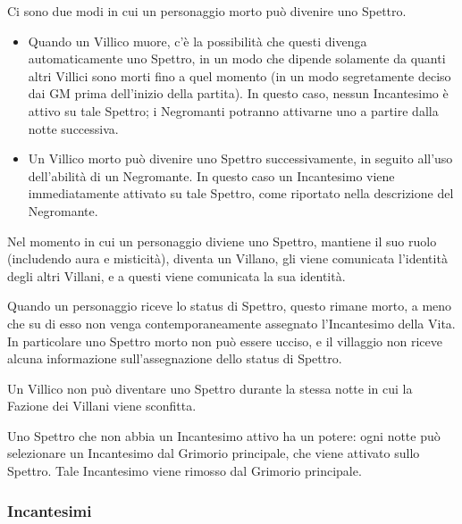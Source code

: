 \documentclass[a4paper,10pt]{article}
\begin{document}
\begin{itemize}
          Ci sono due modi in cui un personaggio morto può divenire uno Spettro.

          \begin{itemize}
              \item Quando un Villico muore, c'è la possibilità che questi divenga automaticamente uno Spettro, in un modo che dipende solamente da quanti altri Villici sono morti fino a quel momento (in un modo segretamente deciso dai GM prima dell'inizio della partita). In questo caso, nessun Incantesimo è attivo su tale Spettro; i Negromanti potranno attivarne uno a partire dalla notte successiva.

              \item Un Villico morto può divenire uno Spettro successivamente, in seguito all'uso dell'abilità di un Negromante. In questo caso un Incantesimo viene immediatamente attivato su tale Spettro, come riportato nella descrizione del Negromante.

          \end{itemize}

          Nel momento in cui un personaggio diviene uno Spettro, mantiene il suo ruolo (includendo aura e misticità), diventa un Villano, gli viene comunicata l'identità degli altri Villani, e a questi viene comunicata la sua identità.

          Quando un personaggio riceve lo status di Spettro, questo rimane morto, a meno che su di esso non venga contemporaneamente assegnato l'Incantesimo della Vita. In particolare uno Spettro morto non può essere ucciso, e il villaggio non riceve alcuna informazione sull'assegnazione dello status di Spettro.

          Un Villico non può diventare uno Spettro durante la stessa notte in cui la Fazione dei Villani viene sconfitta.

          Uno Spettro che non abbia un Incantesimo attivo ha un potere: ogni notte può selezionare un Incantesimo dal Grimorio principale, che viene attivato sullo Spettro. Tale Incantesimo viene rimosso dal Grimorio principale.
\end{itemize}


\subsubsection*{Incantesimi}
\label{incantesimi}
\end{document}
